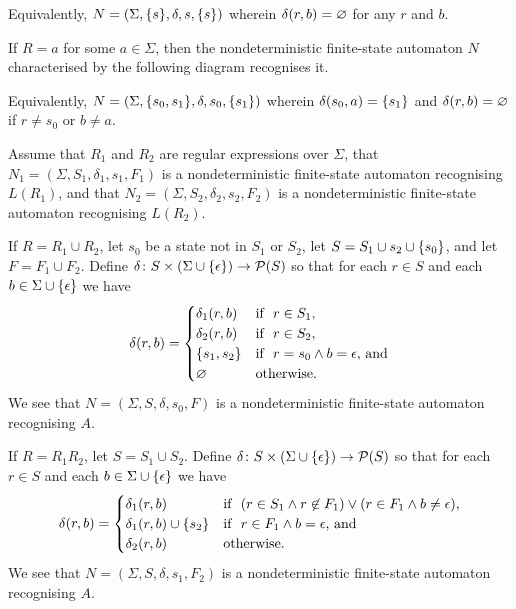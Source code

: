     \noindent Equivalently, \(N = (\Sigma, \{s\}, \delta, s, \{s\})\)
    wherein \(\delta(r, b) = \varnothing\) for any \(r\) and \(b\).

    If \(R = a\) for some \(a \in \Sigma\), then the nondeterministic
    finite-state automaton \(N\) characterised by the following diagram
    recognises it.
    \begin{figure}[!h]
        \centering
    \end{figure}

    \noindent Equivalently, \(N = (\Sigma, \{s_0, s_1\}, \delta, s_0,
    \{s_1\})\) wherein \(\delta(s_0, a) = \{s_1\}\) and \(\delta(r, b) =
    \varnothing\) if \(r \neq s_0\) or \(b \neq a\).

    Assume that \(R_1\) and \(R_2\) are regular expressions over \(\Sigma\),
    that \(N_1 = (\Sigma, S_1, \delta_1, s_1, F_1)\) is a nondeterministic
    finite-state automaton recognising \(L(R_1)\), and that \(N_2 = (\Sigma,
    S_2, \delta_2, s_2, F_2)\) is a nondeterministic finite-state automaton
    recognising \(L(R_2)\).

    If \(R = R_1 \cup R_2\), let \(s_0\) be a state not in \(S_1\) or \(S_2\),
    let \(S = S_1 \cup s_2 \cup \{s_0\}\), and let \(F = F_1 \cup F_2\).
    Define \(\delta\colon S \times (\Sigma \cup \{\epsilon\})\to\mathcal{P}(S)\) so
    that for each \(r \in S\) and each \(b \in \Sigma \cup \{\epsilon\}\) we
    have
    \[
        \delta(r, b) = \begin{cases}
            \delta_1(r, b) & \text{if }\ r \in S_1,\\
            \delta_2(r, b) & \text{if }\ r \in S_2,\\
            \{s_1, s_2\} & \text{if }\ r = s_0 \land b = \epsilon \text{,
            and}\\
            \varnothing & \text{otherwise.}
        \end{cases}
    \]
    We see that \(N = (\Sigma, S, \delta, s_0, F)\) is a nondeterministic
    finite-state automaton recognising \(A\).

    If \(R = R_1 R_2\), let \(S = S_1 \cup S_2\). Define \(\delta\colon S \times
    (\Sigma \cup \{\epsilon\})\to\mathcal{P}(S)\) so that for each \(r \in S\) and
    each \(b \in \Sigma \cup \{\epsilon\}\) we have
    \[
        \delta(r, b) = \begin{cases}
            \delta_1(r, b) & \text{if }\ (r \in S_1 \land r \not\in F_1) \lor (r
            \in F_1 \land b \neq \epsilon),\\
            \delta_1(r, b) \cup \{s_2\} & \text{if }\ r \in F_1 \land b =
            \epsilon \text{, and}\\
            \delta_2(r, b) & \text{otherwise.}
        \end{cases}
    \]
    We see that \(N = (\Sigma, S, \delta, s_1, F_2)\) is a nondeterministic
    finite-state automaton recognising \(A\).

